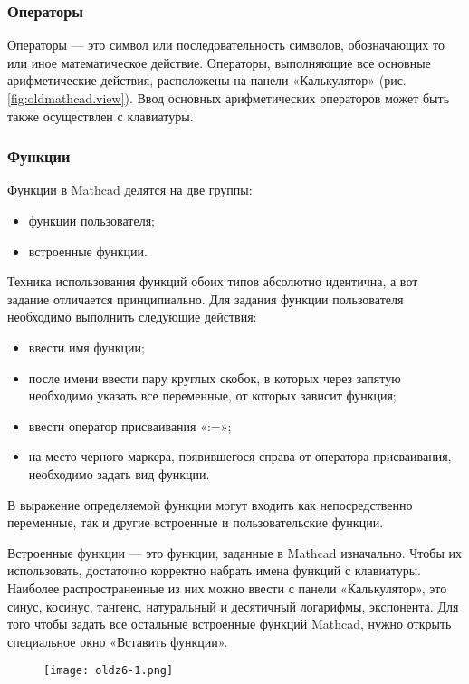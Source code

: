 \subsubsection{Операторы}
Операторы --- это символ или последовательность символов, обозначающих то или иное математическое действие. Операторы, выполняющие все основные арифметические действия, расположены на панели «Калькулятор» (рис. \ref{fig:oldmathcad.view}). Ввод основных арифметических операторов может быть также осуществлен с клавиатуры.

\subsubsection{Функции}
Функции в Mathcad делятся на две группы:
\begin{itemize}
\item функции пользователя;
\item встроенные функции.
\end{itemize}
Техника использования функций обоих типов абсолютно идентична, а вот задание отличается принципиально. Для задания функции пользователя необходимо выполнить следующие действия:
\begin{itemize}
\item ввести имя функции;
\item после имени ввести пару круглых скобок, в которых через запятую необходимо указать все переменные, от которых зависит функция;
\item ввести оператор присваивания «:=»;
\item на место черного маркера, появившегося справа от оператора присваивания, необходимо задать вид функции.
\end{itemize}

В выражение определяемой функции могут входить как непосредственно переменные, так и другие встроенные и пользовательские функции. 

Встроенные функции --- это функции, заданные в Mathcad изначально. Чтобы их использовать, достаточно корректно набрать имена функций с клавиатуры. Наиболее распространенные из них можно ввести с панели «Калькулятор», это синус, косинус, тангенс, натуральный и десятичный логарифмы, экспонента. Для того чтобы задать все остальные встроенные функций Mathcad, нужно открыть специальное окно «Вставить функции».

\begin{figure}[h]
	\begin{center}
		\texttt{[image: oldz6-1.png]}
	\end{center}
\end{figure}

